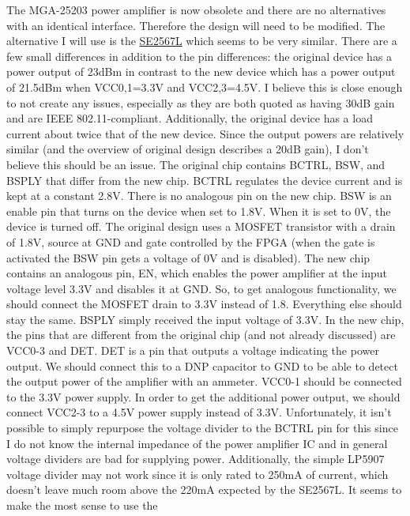 \documentclass{default}
\begin{document}
The MGA-25203 power amplifier is now obsolete and there are no alternatives with an identical
interface. Therefore the design will need to be modified. The alternative I will use is the
\href{http://www.skyworksinc.com/uploads/documents/202425A.pdf}{SE2567L} which seems to be very
similar. There are a few small differences in addition to the pin differences: the original device
has a power output of 23dBm in contrast to the new device which has a power output of 21.5dBm when
VCC0,1=3.3V and VCC2,3=4.5V. I believe this is close enough to not create any issues, especially as
they are both quoted as having 30dB gain and are IEEE 802.11-compliant. Additionally, the original
device has a load current about twice that of the new device. Since the output powers are relatively
similar (and the overview of original design describes a 20dB gain), I don't believe this should be
an issue. The original chip contains BCTRL, BSW, and BSPLY that differ from the new chip. BCTRL
regulates the device current and is kept at a constant 2.8V. There is no analogous pin on the new
chip. BSW is an enable pin that turns on the device when set to 1.8V. When it is set to 0V, the
device is turned off. The original design uses a MOSFET transistor with a drain of 1.8V, source at
GND and gate controlled by the FPGA (when the gate is activated the BSW pin gets a voltage of 0V and
is disabled). The new chip contains an analogous pin, EN, which enables the power amplifier at the
input voltage level 3.3V and disables it at GND. So, to get analogous functionality, we should
connect the MOSFET drain to 3.3V instead of 1.8. Everything else should stay the same. BSPLY simply
received the input voltage of 3.3V. In the new chip, the pins that are different from the original
chip (and not already discussed) are VCC0-3 and DET. DET is a pin that outputs a voltage indicating
the power output. We should connect this to a DNP capacitor to GND to be able to detect the output
power of the amplifier with an ammeter. VCC0-1 should be connected to the 3.3V power supply. In
order to get the additional power output, we should connect VCC2-3 to a 4.5V power supply instead of
3.3V. Unfortunately, it isn't possible to simply repurpose the voltage divider to the BCTRL pin for
this since I do not know the internal impedance of the power amplifier IC and in general voltage
dividers are bad for supplying power. Additionally, the simple LP5907 voltage divider may not work
since it is only rated to 250mA of current, which doesn't leave much room above the 220mA expected
by the SE2567L. It seems to make the most sense to use the
\end{document}
